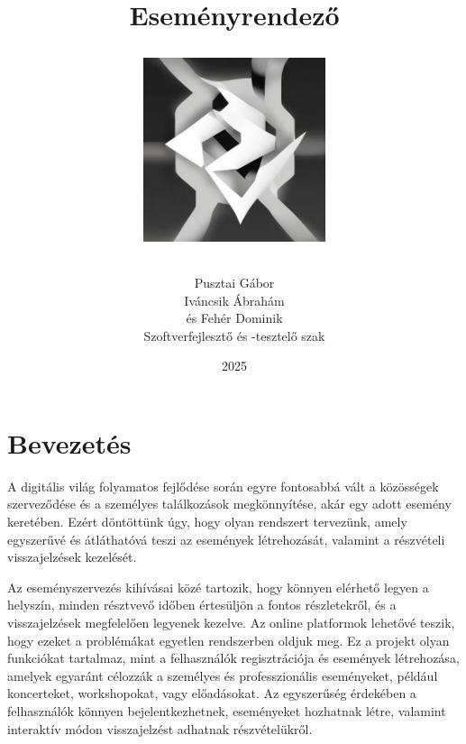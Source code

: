 \documentclass[colorlinks]{thesis-kando}
\theoremstyle{definition}
\theoremstyle{remark}
\begin{document}
\title{Eseményrendező\\[1em]
	\begin{center}
		\includegraphics[width=0.4\textwidth]{logo.jpg}
\end{center}}
\author{Pusztai Gábor\\ Iváncsik Ábrahám\\és Fehér Dominik\\Szoftverfejlesztő és -tesztelő szak}
\date{2025}
\maketitle

\tableofcontents

\chapter*{Bevezetés}

A digitális világ folyamatos fejlődése során egyre fontosabbá vált a közösségek szerveződése és a személyes találkozások megkönnyítése, akár egy adott esemény keretében. Ezért döntöttünk úgy, hogy olyan rendszert tervezünk, amely egyszerűvé és átláthatóvá teszi az események létrehozását, valamint a részvételi visszajelzések kezelését.

 Az eseményszervezés kihívásai közé tartozik, hogy könnyen elérhető legyen a helyszín, minden résztvevő időben értesüljön a fontos részletekről, és a visszajelzések megfelelően legyenek kezelve. Az online platformok lehetővé teszik, hogy ezeket a problémákat egyetlen rendszerben oldjuk meg. Ez a projekt olyan funkciókat tartalmaz, mint a felhasználók regisztrációja és események létrehozása, amelyek egyaránt célozzák a személyes és professzionális eseményeket, például koncerteket, workshopokat, vagy előadásokat. Az egyszerűség érdekében a felhasználók könnyen bejelentkezhetnek, eseményeket hozhatnak létre, valamint interaktív módon visszajelzést adhatnak részvételükről.
 
\end{document}
